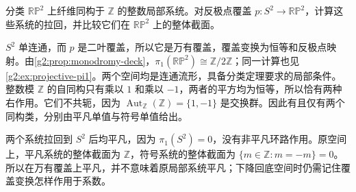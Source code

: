 \begin{exercise}\label{g2:ex:projective-rank-one-system}
	分类 \(\mathbb{RP}^2\) 上纤维同构于 \(\mathbb Z\) 的整数局部系统。对反极点覆盖 \(p:S^2\to\mathbb{RP}^2\)，计算这些系统的拉回，并比较它们在 \(\mathbb{RP}^2\) 上的整体截面。
\end{exercise}
\begin{solution}
	\(S^2\) 单连通，而 \(p\) 是二叶覆盖，所以它是万有覆盖，覆盖变换为恒等和反极点映射。由\cref{g2:prop:monodromy-deck}，\(\pi_1(\mathbb{RP}^2)\cong\mathbb Z/2\mathbb Z\)；同一计算也见\cref{g2:ex:projective-pi1}。两个空间均是连通流形，具备分类定理要求的局部条件。整数模 \(\mathbb Z\) 的自同构只有乘以 \(1\) 和乘以 \(-1\)，两者的平方均为恒等，所以恰有两种右作用。它们不共轭，因为 \(\operatorname{Aut}_{\mathbb Z}(\mathbb Z)=\{1,-1\}\) 是交换群。因此有且仅有两个同构类，分别由平凡单值与符号单值给出。

	两个系统拉回到 \(S^2\) 后均平凡，因为 \(\pi_1(S^2)=0\)，没有非平凡环路作用。原空间上，平凡系统的整体截面为 \(\mathbb Z\)，符号系统的整体截面为 \(\{m\in\mathbb Z:m=-m\}=0\)。所以在万有覆盖上平凡，并不意味着原局部系统平凡；下降回底空间时仍需记住覆盖变换怎样作用于系数。
\end{solution}

